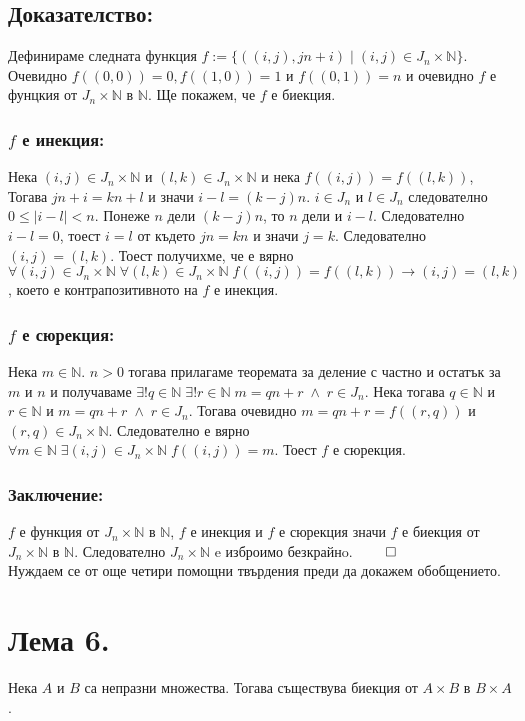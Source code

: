 \documentclass[a4paper, 12pt, oneside]{article}
\newcommand{\N}{\mathbb{N}}
\begin{document}
\subsection*{Доказателство:}
Дефинираме следната функция \(f := \{((i, j), jn + i) \; | \; (i, j) \in J_n \times \N\}\).
Очевидно \(f((0, 0)) = 0, f((1, 0)) = 1\) и \(f((0, 1)) = n\)
и очевидно \(f\) е фунцкия от \(J_n \times \N\) в \(\N\). Ще покажем, че \(f\) е биекция.
\subsubsection*{\(f\) е инекция:}
Нека \((i, j) \in J_n \times \N\) и \((l, k) \in J_n \times \N\) и нека \(f((i, j)) = f((l, k))\),
Тогава \(jn + i = kn + l\) и значи \(i - l = (k - j)n\). \(i \in J_n\) и \(l \in J_n\)
следователно \(0 \leq |i - l| < n\). Понеже \(n\) дели \((k - j)n\), то \(n\) дели и \(i - l\).
Следователно \(i - l = 0\), тоест \(i = l\) от където \(jn = kn\) и значи \(j = k\).
Следователно \((i, j) = (l, k)\).
Тоест получихме, че е вярно \(\forall (i, j) \in J_n \times \N \; \forall (l, k) \in J_n \times \N \; f((i, j)) = f((l, k)) \longrightarrow (i, j) = (l, k)\),
което е контрапозитивното на \(f\) е инекция.
\subsubsection*{\(f\) е сюрекция:}
Нека \(m \in \N\). \(n > 0\) тогава прилагаме теоремата за деление с частно и остатък за \(m\) и \(n\)
и получаваме \(\exists! q \in \N \; \exists! r \in \N \; m = qn + r \; \land \; r \in J_n\).
Нека тогава \(q \in \N\) и \(r \in \N\) и \(m = qn + r \; \land \; r \in J_n\).
Тогава очевидно \(m = qn + r = f((r, q))\) и \((r, q) \in J_n \times \N\).
Следователно е вярно \(\forall m \in \N \; \exists (i, j) \in J_n \times \N \; f((i, j)) = m\).
Тоест \(f\) е сюрекция.
\subsubsection*{Заключение:}
\(f\) е функция от \(J_n \times \N\)  в \(\N\),  \(f\) е инекция и \(f\) е сюрекция
значи \(f\) е биекция от \(J_n \times \N\)  в \(\N\). Следователно \(J_n \times \N\) e изброимо безкрайнo. \(\qed\) \\
Нуждаем се от още четири помощни твърдения преди да докажем обобщението.
\section*{Лема 6.}
Нека \(A\) и \(B\) са непразни множества.
Тогава съществува биекция от \(A \times B\) в \(B \times A\).
\end{document}

